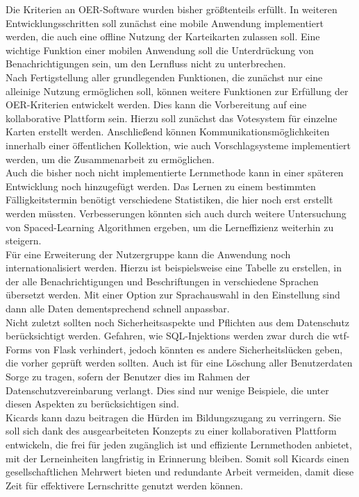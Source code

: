 Die Kriterien an OER-Software wurden bisher größtenteils erfüllt. In weiteren Entwicklungsschritten soll zunächst eine mobile Anwendung implementiert werden, die auch eine offline Nutzung der Karteikarten zulassen soll. Eine wichtige Funktion einer mobilen Anwendung soll die Unterdrückung von Benachrichtigungen sein, um den Lernfluss nicht zu unterbrechen. \\

Nach Fertigstellung aller grundlegenden Funktionen, die zunächst nur eine alleinige Nutzung ermöglichen soll, können weitere Funktionen zur Erfüllung der OER-Kriterien entwickelt werden. Dies kann die Vorbereitung auf eine kollaborative Plattform sein. Hierzu soll zunächst das Votesystem für einzelne Karten erstellt werden. Anschließend können Kommunikationsmöglichkeiten innerhalb einer öffentlichen Kollektion, wie auch Vorschlagsysteme implementiert werden, um die Zusammenarbeit zu ermöglichen.\\

Auch die bisher noch nicht implementierte Lernmethode kann in einer späteren Entwicklung noch hinzugefügt werden. Das Lernen zu einem bestimmten Fälligkeitstermin benötigt verschiedene Statistiken, die hier noch erst erstellt werden müssten. Verbesserungen könnten sich auch durch weitere Untersuchung von Spaced-Learning Algorithmen ergeben, um die Lerneffizienz weiterhin zu steigern. \\

Für eine Erweiterung der Nutzergruppe kann die Anwendung noch internationalisiert werden. Hierzu ist beispielsweise eine Tabelle zu erstellen, in der alle Benachrichtigungen und  Beschriftungen in verschiedene Sprachen übersetzt werden. Mit einer Option zur Sprachauswahl in den Einstellung sind dann alle Daten dementsprechend schnell anpassbar. \\

Nicht zuletzt sollten noch Sicherheitsaspekte und Pflichten aus dem Datenschutz berücksichtigt werden. Gefahren, wie SQL-Injektions werden zwar durch die wtf-Forms von Flask verhindert, jedoch könnten es andere Sicherheitslücken geben, die vorher geprüft werden sollten. Auch ist für eine Löschung aller Benutzerdaten Sorge zu tragen, sofern der Benutzer dies im Rahmen der Datenschutzvereinbarung verlangt. Dies sind nur wenige Beispiele, die unter diesen Aspekten zu berücksichtigen sind.\\

Kicards kann dazu beitragen die Hürden im Bildungszugang zu verringern. Sie soll sich dank des ausgearbeiteten Konzepts zu einer kollaborativen Plattform entwickeln, die frei für jeden zugänglich ist und effiziente Lernmethoden anbietet, mit der Lerneinheiten langfristig in Erinnerung bleiben. Somit soll Kicards einen gesellschaftlichen Mehrwert bieten und redundante Arbeit vermeiden, damit diese Zeit für effektivere Lernschritte genutzt werden können.

